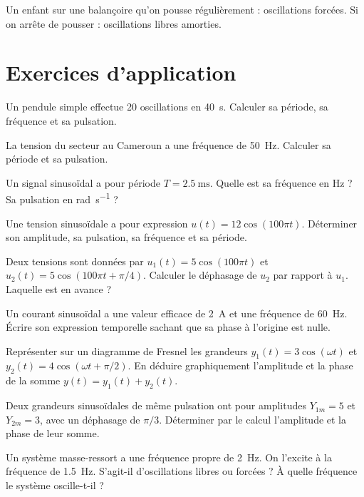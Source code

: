 \begin{exemple}
Un enfant sur une balançoire qu'on pousse régulièrement : oscillations forcées. Si on arrête de pousser : oscillations libres amorties.
\end{exemple}

\section{Exercices d'application}


\exo{} Un pendule simple effectue 20 oscillations en \SI{40}{\second}. Calculer sa période, sa fréquence et sa pulsation.

\exo{} La tension du secteur au Cameroun a une fréquence de \SI{50}{\hertz}. Calculer sa période et sa pulsation.

\exo{} Un signal sinusoïdal a pour période $T = \SI{2.5}{\milli\second}$. Quelle est sa fréquence en \si{\hertz} ? Sa pulsation en \si{\radian\per\second} ?


\exo{} Une tension sinusoïdale a pour expression $u(t) = 12\cos(100\pi t)$. Déterminer son amplitude, sa pulsation, sa fréquence et sa période.

\exo{} Deux tensions sont données par $u_1(t) = 5\cos(100\pi t)$ et $u_2(t) = 5\cos(100\pi t + \pi/4)$. Calculer le déphasage de $u_2$ par rapport à $u_1$. Laquelle est en avance ?

\exo{} Un courant sinusoïdal a une valeur efficace de \SI{2}{\ampere} et une fréquence de \SI{60}{\hertz}. Écrire son expression temporelle sachant que sa phase à l'origine est nulle.


\exo{} Représenter sur un diagramme de Fresnel les grandeurs $y_1(t) = 3\cos(\omega t)$ et $y_2(t) = 4\cos(\omega t + \pi/2)$. En déduire graphiquement l'amplitude et la phase de la somme $y(t) = y_1(t) + y_2(t)$.

\exo{} Deux grandeurs sinusoïdales de même pulsation ont pour amplitudes $Y_{1m} = 5$ et $Y_{2m} = 3$, avec un déphasage de $\pi/3$. Déterminer par le calcul l'amplitude et la phase de leur somme.


\exo{} Un système masse-ressort a une fréquence propre de \SI{2}{\hertz}. On l'excite à la fréquence de \SI{1.5}{\hertz}. S'agit-il d'oscillations libres ou forcées ? À quelle fréquence le système oscille-t-il ?

